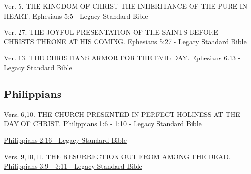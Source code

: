 \documentclass[
  ignorenonframetext,
]{beamer}
\begin{document}
\begin{frame}{5}
\label{section-211}
\begin{block}{Ver. 5. THE KINGDOM OF CHRIST THE INHERITANCE OF THE PURE
IN HEART.}
\label{ver.-5.-the-kingdom-of-christ-the-inheritance-of-the-pure-in-heart.}
\href{https://read.lsbible.org/?q=eph5\%3A5}{Ephesians 5:5 - Legacy
Standard Bible}
\end{block}

\begin{block}{Ver. 27. THE JOYFUL PRESENTATION OF THE SAINTS BEFORE
CHRIST\textquotesingle S THRONE AT HIS COMING.}
\label{ver.-27.-the-joyful-presentation-of-the-saints-before-christs-throne-at-his-coming.}
\href{https://read.lsbible.org/?q=eph5\%3A27}{Ephesians 5:27 - Legacy
Standard Bible}
\end{block}
\end{frame}

\begin{frame}{6}
\label{section-212}
\begin{block}{Ver. 13. THE CHRISTIAN\textquotesingle S ARMOR FOR THE
EVIL DAY.}
\label{ver.-13.-the-christians-armor-for-the-evil-day.}
\href{https://read.lsbible.org/?q=eph6\%3A13}{Ephesians 6:13 - Legacy
Standard Bible}
\end{block}
\end{frame}

\subsection{Philippians}\label{philippians}

\begin{frame}{1}
\label{section-213}
\begin{block}{Vers. 6,10. THE CHURCH PRESENTED IN PERFECT HOLINESS AT
THE DAY OF CHRIST.}
\label{vers.-610.-the-church-presented-in-perfect-holiness-at-the-day-of-christ.}
\href{https://read.lsbible.org/?q=phil1\%3A6-10}{Philippians 1:6 - 1:10
- Legacy Standard Bible}
\end{block}
\end{frame}

\begin{frame}{2}
\label{section-214}
\href{https://read.lsbible.org/?q=phil2\%3A16}{Philippians 2:16 - Legacy
Standard Bible}
\end{frame}

\begin{frame}{3}
\label{section-215}
\begin{block}{Vers. 9,10,11. THE RESURRECTION OUT FROM AMONG THE DEAD.}
\label{vers.-91011.-the-resurrection-out-from-among-the-dead.}
\href{https://read.lsbible.org/?q=phil3\%3A9-11}{Philippians 3:9 - 3:11
- Legacy Standard Bible}
\end{block}
\end{frame}
\end{document}
